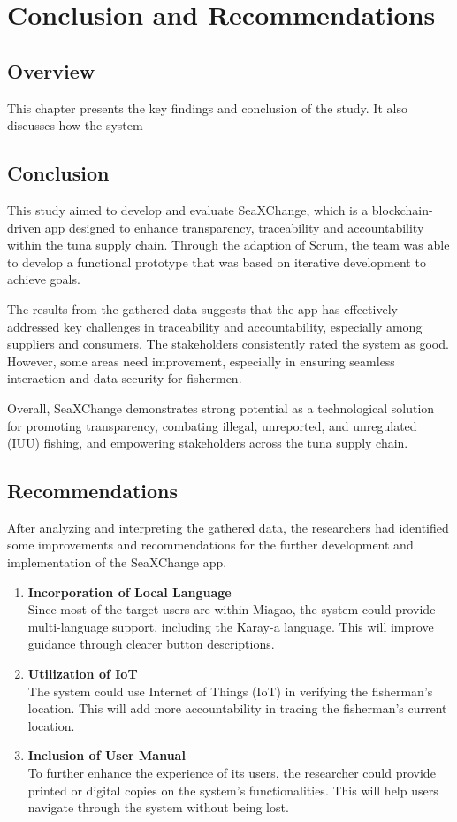 \chapter{Conclusion and Recommendations}
\section{Overview}
This chapter  presents the key findings and conclusion of the study. It also discusses how the system  


\section{Conclusion}
This study aimed to develop and evaluate SeaXChange, which is a blockchain-driven app designed to enhance transparency, traceability and accountability within the tuna supply chain. Through the adaption of Scrum, the team was able to develop a functional prototype that was based on iterative development to achieve goals. 

\noindent The results from the gathered data suggests that the app has effectively addressed key challenges in traceability and accountability, especially among suppliers and consumers. The stakeholders consistently rated the system as good. However, some areas need improvement, especially in ensuring seamless interaction and data security for fishermen.

\noindent Overall, SeaXChange demonstrates strong potential as a technological solution for promoting transparency, combating illegal, unreported, and unregulated (IUU) fishing, and empowering stakeholders across the tuna supply chain.

\section{Recommendations}
After analyzing and interpreting the gathered data, the researchers had identified some improvements and recommendations for the further development and implementation of the SeaXChange app.
	\begin{enumerate}
		\item \textbf{Incorporation of Local Language}
		\\Since most of the target users are within Miagao, the system could provide multi-language support, including the Karay-a language. This will improve guidance through clearer button descriptions.
		
		\item \textbf{Utilization of IoT}
		\\The system could use Internet of Things (IoT) in verifying the fisherman's location. This will add more accountability in tracing the fisherman's current location.
		
		\item \textbf{Inclusion of User Manual }
		\\To further enhance the experience of its users, the researcher could provide printed or digital copies on the system's functionalities. This will help users navigate through the system without being lost.
	\end{enumerate}
	
